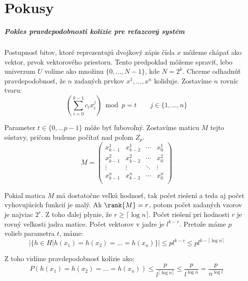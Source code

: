 \chapter{Pokusy}
\paragraph{Pokles pravdepodobnosti kolízie pre reťazcový systém}

Postupnosť bitov, ktoré reprezentujú dvojkový zápis čísla $x$ môžeme chápať ako vektor, prvok vektorového priestoru. Tento predpoklad môžeme spraviť, lebo univerzum $U$ volíme ako množinu $\{0, \dots, N - 1 \}$, kde $N = 2^k$. Chceme odhadnúť pravdepodobnosť, že $n$ zadaných prvkov $x^1, \dots, x^n$ koliduje. Zostavíme $n$ rovníc tvaru:
\begin{displaymath}
\left(\displaystyle \sum_{i=0}^{k-1} c_i x_i^j\right) \bmod p = t \qquad j \in \{1, \dots, n\}
\end{displaymath}

Parameter $t \in \{0, \dots p-1\}$ môže byť ľubovoľný. Zostavíme maticu $M$ tejto sústavy, pričom budeme počítať nad poľom $Z_p$. 
\begin{displaymath}
M = \begin{pmatrix}
  x_{k-1}^1 & x_{k-2}^1 & \cdots & x_0^1  \\
  x_{k-1}^2 & x_{k-2}^2 & \cdots & x_0^2  \\
  \vdots  	& \vdots  	& \ddots & \vdots \\
  x_{k-1}^n & x_{k-2}^n & \cdots & x_0^n  \\
 \end{pmatrix}
\end{displaymath}

Pokiaľ matica $M$ má dostatočne veľkú hodnosť, tak počet riešení a teda aj počet vyhovujúcich funkcií je malý. Ak $\rank{M} = r$, potom počet zadaných vzorov je najviac $2^r$. Z toho ďalej plynie, že $r \geq \lceil \log n \rceil$. Počet riešení pri hodnosti $r$ je rovný veľkosti jadra matice. Počet vektorov v jadre je $l^{k-r}$. Pretože máme $p$ volieb parametra $t$, máme:
\begin{displaymath}
|\{ h \in H | h(x_1) = h(x_2) = \dots = h(x_n) \}| \leq p l^{k-r} \leq p l^{k - \lceil \log n \rceil}
\end{displaymath}

Z toho vidíme pravdepodobnosť kolízie ako:
\begin{displaymath}
P(h(x_1) = h(x_2) = \dots = h(x_n)) \leq \frac{p}{l^{\lceil \log n \rceil}} \leq \frac{p}{l^{\log n}} = \frac{p}{n^{\log l}}
\end{displaymath}

